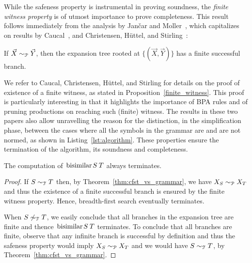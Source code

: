 While the safeness property is instrumental in proving
soundness, the \emph{finite witness property} is of
utmost importance to prove completeness. This result follows
immediately from the analysis by Jan{\v{c}}ar and
Moller~\cite{janvcar1999techniques}, which capitalizes on results by
Caucal~\cite{caucal1986decidabilite}, and Christensen, H{\"{u}}ttel, and
Stirling~\cite{DBLP:journals/iandc/ChristensenHS95}:

\begin{proposition} 
\label{finite_witness}
	If $\vec X \sim_\mathcal P \vec Y$, then the expansion tree rooted at
	$\{(\vec X, \vec Y)\}$ has a finite successful branch.
\end{proposition}

We refer to Caucal, Christensen, H{\"{u}}ttel, and Stirling for
details on the proof of existence of a finite witness, as stated in
Proposition~\ref{finite_witness}. This proof is particularly
interesting in that it highlights the importance of BPA rules and of
pruning productions on reaching such (finite) witness. The results in
these two papers also allow unravelling the reason for the
distinction, in the simplification phase, between the cases where all
the symbols in the grammar are and are not normed, as shown in
Listing~\ref{lst:algorithm}.
%
These properties ensure the termination of the algorithm, its soundness
and completeness.

\begin{lemma}[Termination]
\label{lem:termination}
	The computation of $\bisimf S T$ always terminates.
\end{lemma}
%
\begin{proof}
	If $S\sim_\mathcal T T$ then, by Theorem~\ref{thm:cfst_vs_grammar},
	we have $X_S\sim_\mathcal P X_T$ and thus the existence of a finite
	successful branch is ensured by the finite witness property. 
	Hence, breadth-first search eventually terminates. 
	
	When $S\not\sim_\mathcal T T$, we easily conclude that all branches
        in the expansion tree are finite and thence $\bisimf S T$
        terminates.  To conclude that all branches are finite, observe
        that any infinite branch is successful by definition and thus
        the safeness property would imply $X_S\sim_\mathcal P X_T$ and we
        would have $S\sim_\mathcal T T$, by Theorem~\ref{thm:cfst_vs_grammar}.
\end{proof}


